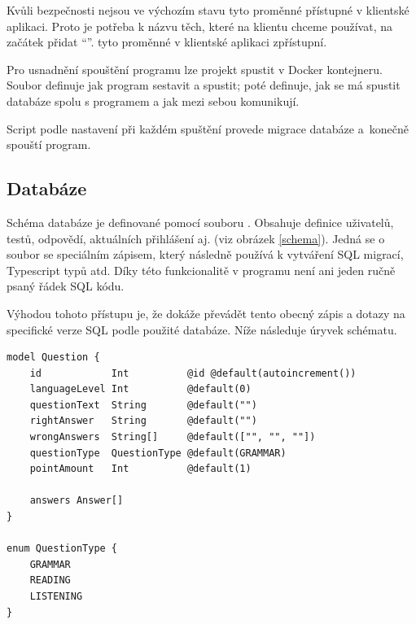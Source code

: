Kvůli bezpečnosti nejsou ve výchozím stavu tyto proměnné přístupné v klientské aplikaci. Proto je potřeba k názvu těch, které na klientu chceme používat, na začátek přidat \enquote{}.  tyto proměnné v klientské aplikaci zpřístupní.

Pro usnadnění spouštění programu lze projekt spustit v Docker kontejneru. Soubor  definuje jak program sestavit a spustit;  poté definuje, jak se má spustit databáze spolu s programem a jak mezi sebou komunikují. \cite{docker}

Script  podle nastavení při každém spuštění provede migrace databáze a~konečně spouští program.

\subsection{Databáze}

Schéma databáze je definované pomocí souboru . Obsahuje definice uživatelů, testů, odpovědí, aktuálních přihlášení aj. (viz obrázek \ref{schema}). Jedná se o soubor se speciálním zápisem, který následně  používá k vytváření SQL migrací, Typescript typů atd. Díky této funkcionalitě v programu není ani jeden ručně psaný řádek SQL kódu.

Výhodou tohoto přístupu je, že  dokáže převádět tento obecný zápis a dotazy na specifické verze SQL podle použité databáze. \cite{prisma} Níže následuje úryvek schématu.

\begin{lstlisting}[language=Prisma, caption={Úryvek schématu databáze}]
model Question {
    id            Int          @id @default(autoincrement())
    languageLevel Int          @default(0)
    questionText  String       @default("")
    rightAnswer   String       @default("")
    wrongAnswers  String[]     @default(["", "", ""])
    questionType  QuestionType @default(GRAMMAR)
    pointAmount   Int          @default(1)

    answers Answer[]
}

enum QuestionType {
    GRAMMAR
    READING
    LISTENING
}
\end{lstlisting}


